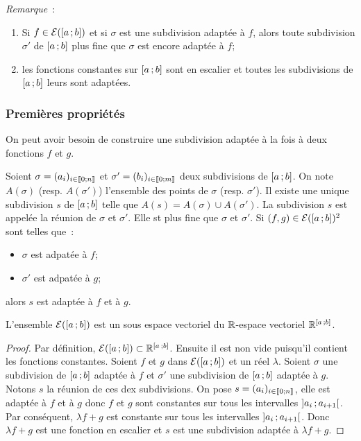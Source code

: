 \emph{Remarque}~:
\begin{enumerate}
\item Si $f \in \mathcal{E}(\left[ a \, ;  b \right])$ et si $\sigma$ est une subdivision adaptée à $f$, alors toute subdivision $\sigma'$ de $\left[ a \, ;  b \right]$ plus fine que $\sigma$ est encore adaptée à $f$;
\item les fonctions constantes sur $\left[ a \, ;  b \right]$ sont en escalier et toutes les subdivisions de $\left[ a \, ;  b \right]$ leurs sont adaptées.
\end{enumerate}

\subsubsection{Premières propriétés}

On peut avoir besoin de construire une subdivision adaptée à la fois à deux fonctions $f$ et $g$.

Soient $\sigma=(a_i)_{i \in \mathopen{\llbracket}0\mathclose{}\mathpunct{};n\mathclose{\rrbracket}}$ et $\sigma'=(b_i)_{i \in \mathopen{\llbracket}0\mathclose{}\mathpunct{};m\mathclose{\rrbracket}}$ deux subdivisions de $\left[ a \, ;  b \right]$. On note $A(\sigma)$ (resp. $A(\sigma')$) l'ensemble des points de $\sigma$ (resp. $\sigma'$). Il existe une unique subdivision $s$ de $\left[ a \, ;  b \right]$ telle que $A(s)=A(\sigma) \cup A(\sigma')$. La subdivision $s$ est appelée la réunion de $\sigma$ et $\sigma'$. Elle st plus fine que $\sigma$ et $\sigma'$. Si $(f,g) \in \mathcal{E}(\left[ a \, ;  b \right])^2$ sont telles que~:
\begin{itemize}
\item $\sigma$ est adpatée à $f$;
\item $\sigma'$ est adpatée à $g$;
\end{itemize}
alors $s$ est adaptée à $f$ et à $g$.

\begin{prop}
  L'ensemble $\mathcal{E}(\left[ a \, ;  b \right])$ est un sous espace vectoriel du $\mathbb{R}$-espace vectoriel $\mathbb{R}^{\left[ a \, ;  b \right]}$.
\end{prop}
\begin{proof}
  Par définition, $\mathcal{E}(\left[ a \, ;  b \right]) \subset \mathbb{R}^{\left[ a \, ;  b \right]}$. Ensuite il est non vide puisqu'il contient les fonctions constantes. Soient $f$ et $g$ dans $\mathcal{E}(\left[ a \, ;  b \right])$ et un réel $\lambda$. Soient $\sigma$ une subdivision de $\left[ a \, ;  b \right]$ adaptée à $f$ et $\sigma'$ une subdivision de $\left[ a \, ;  b \right]$ adaptée à $g$. Notons $s$ la réunion de ces dex subdivisions. On pose $s=(a_i)_{i \in \mathopen{\llbracket}0\mathclose{}\mathpunct{};n\mathclose{\rrbracket}}$, elle est adaptée à $f$ et à $g$ donc $f$ et $g$ sont constantes sur tous les intervalles $\left] a_i \, ;  a_{i+1} \right[$. Par conséquent, $\lambda f +g$ est constante sur tous les intervalles $\left] a_i \, ;  a_{i+1} \right[$. Donc $\lambda f +g$ est une fonction en escalier et $s$ est une subdivision adaptée à $\lambda f+g$.
\end{proof}


